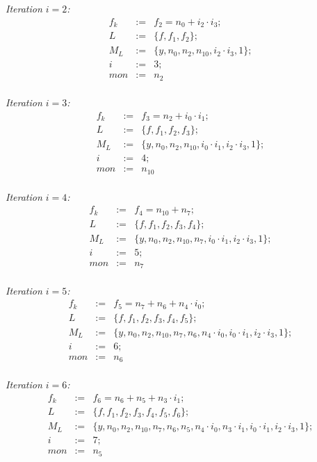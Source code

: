 \begin{Example}
	{\it Iteration $i=2$:}
	\begin{eqnarray}
		f_{k}&:=&f_{2}=n_0+i_2\cdot i_3; \nonumber \\
		L&:=&\{f,f_1,f_{2}\}; \nonumber \\
		M_{L}&:=&\{ y,n_0,n_2,n_{10},i_2 \cdot i_3,1\}; \nonumber \\
		i&:=&3;  \nonumber \\
		mon&:=& n_2\nonumber 
	\end{eqnarray}\\
	
	{\it Iteration $i=3$:}
	\begin{eqnarray}
		f_{k}&:=&f_{3}=n_2+i_0\cdot i_1; \nonumber \\
		L&:=&\{f,f_1,f_{2},f_{3}\}; \nonumber \\
		M_{L}&:=&\{ y,n_0,n_2,n_{10},i_0 \cdot i_1,i_2 \cdot i_3,1\}; \nonumber \\
		i&:=&4;  \nonumber \\
		mon&:=& n_{10}\nonumber 
	\end{eqnarray}\\

	{\it Iteration $i=4$:}
	\begin{eqnarray}
		f_{k}&:=&f_{4}=n_{10}+n_7; \nonumber \\
		L&:=&\{f,f_1,f_{2},f_{3},f_{4}\}; \nonumber \\
		M_{L}&:=&\{ y,n_0,n_2,n_{10},n_7,i_0\cdot i_1,i_2\cdot i_3,1\}; \nonumber \\
		i&:=&5;  \nonumber \\
		mon&:=& n_7\nonumber 
	\end{eqnarray}\\
	
	
	{\it Iteration $i=5$:}
	\begin{eqnarray}
		f_{k}&:=&f_{5}=n_7+n_6+n_4\cdot i_0; \nonumber \\
		L&:=&\{f,f_1,f_{2},f_{3},f_{4},f_{5}\}; \nonumber \\
		M_{L}&:=&\{ y,n_0,n_2,n_{10},n_7,n_6,n_4\cdot i_0,i_0\cdot i_1,i_2\cdot i_3,1\}; \nonumber \\
		i&:=&6;  \nonumber \\
		mon&:=& n_6\nonumber 
	\end{eqnarray}\\
	
	{\it Iteration $i=6$:}
	\begin{eqnarray}
		f_{k}&:=&f_{6}=n_6+n_5+n_3\cdot i_1; \nonumber \\
		L&:=&\{ f,f_1,f_{2},f_{3},f_{4},f_{5},f_{6}\}; \nonumber \\
		M_{L}&:=&\{ y,n_0,n_2,n_{10},n_7,n_6,n_5,n_4\cdot i_0,n_3\cdot i_1,i_0\cdot i_1,i_2\cdot i_3,1\}; \nonumber \\
		i&:=&7;  \nonumber \\
		mon&:=& n_5\nonumber 
	\end{eqnarray}\\
	

\end{Example}
